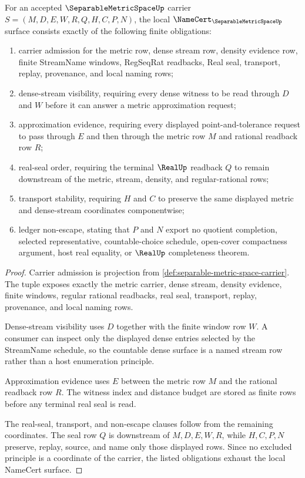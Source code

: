 \begin{theorem}
\label{thm:separable-metric-space-namecert-obligations}
For an accepted $\SeparableMetricSpaceUp$ carrier $S=(M,D,E,W,R,Q,H,C,P,N)$, the local $\NameCert_{\SeparableMetricSpaceUp}$ surface consists exactly of the following finite obligations:
\begin{enumerate}
\item carrier admission for the metric row, dense stream row, density evidence row, finite StreamName windows, RegSeqRat readbacks, Real seal, transport, replay, provenance, and local naming rows;
\item dense-stream visibility, requiring every dense witness to be read through $D$ and $W$ before it can answer a metric approximation request;
\item approximation evidence, requiring every displayed point-and-tolerance request to pass through $E$ and then through the metric row $M$ and rational readback row $R$;
\item real-seal order, requiring the terminal $\RealUp$ readback $Q$ to remain downstream of the metric, stream, density, and regular-rational rows;
\item transport stability, requiring $H$ and $C$ to preserve the same displayed metric and dense-stream coordinates componentwise;
\item ledger non-escape, stating that $P$ and $N$ export no quotient completion, selected representative, countable-choice schedule, open-cover compactness argument, host real equality, or $\RealUp$ completeness theorem.
\end{enumerate}
\end{theorem}
\begin{proof}
Carrier admission is projection from \autoref{def:separable-metric-space-carrier}. The tuple exposes exactly the metric carrier, dense stream, density evidence, finite windows, regular rational readbacks, real seal, transport, replay, provenance, and local naming rows.

Dense-stream visibility uses $D$ together with the finite window row $W$. A consumer can inspect only the displayed dense entries selected by the StreamName schedule, so the countable dense surface is a named stream row rather than a host enumeration principle.

Approximation evidence uses $E$ between the metric row $M$ and the rational readback row $R$. The witness index and distance budget are stored as finite rows before any terminal real seal is read.

The real-seal, transport, and non-escape clauses follow from the remaining coordinates. The seal row $Q$ is downstream of $M,D,E,W,R$, while $H,C,P,N$ preserve, replay, source, and name only those displayed rows. Since no excluded principle is a coordinate of the carrier, the listed obligations exhaust the local NameCert surface.
\end{proof}

